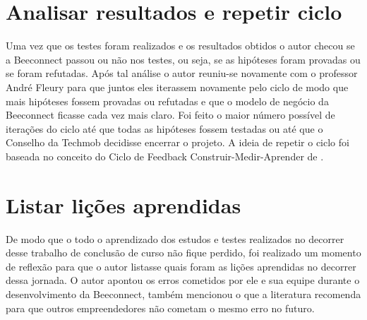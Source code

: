 \section{Analisar resultados e repetir ciclo}
\label{cha:analisar_resultados}
Uma vez que os testes foram realizados e os resultados obtidos o autor checou se a Beeconnect passou ou não nos testes, ou seja, se as hipóteses foram provadas ou se foram refutadas. 
Após tal análise o autor reuniu-se novamente com o professor André Fleury para que juntos eles iterassem novamente pelo ciclo de modo que mais hipóteses fossem provadas ou refutadas e que o modelo de negócio da Beeconnect ficasse cada vez mais claro. Foi feito o maior número possível de iterações do ciclo até que todas as hipóteses fossem testadas ou até que o Conselho da Techmob decidisse encerrar o projeto. A ideia de repetir o ciclo foi baseada no conceito do Ciclo de Feedback Construir-Medir-Aprender de .

\section{Listar lições aprendidas}
\label{cha:listar_licoes_aprendidas}
De modo que o todo o aprendizado dos estudos e testes realizados no decorrer desse trabalho de conclusão de curso não fique perdido, foi realizado um momento de reflexão para que o autor listasse quais foram as lições aprendidas no decorrer dessa jornada. O autor apontou os erros cometidos por ele e sua equipe durante o desenvolvimento da Beeconnect, também mencionou o que a literatura recomenda para que outros empreendedores não cometam o mesmo erro no futuro.